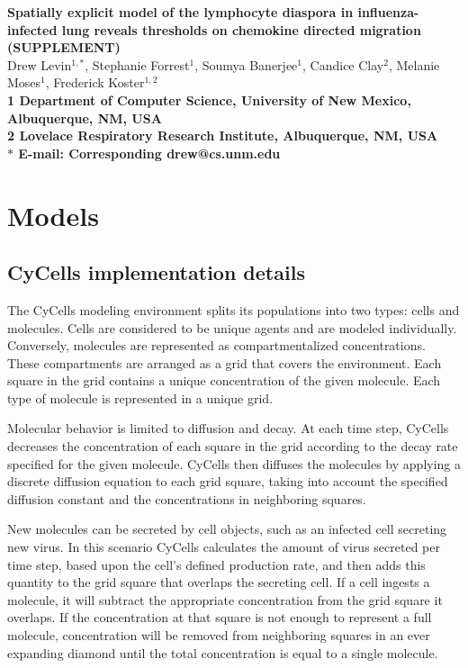 \documentclass[10pt]{article}
\date{}
\begin{document}
\begin{flushleft}
{\Large
\textbf{Spatially explicit model of the lymphocyte diaspora in influenza-infected lung reveals thresholds on chemokine directed migration (SUPPLEMENT)}
}
\\
Drew Levin$^{1,\ast}$, 
Stephanie Forrest$^{1}$, 
Soumya Banerjee$^{1}$,
Candice Clay$^{2}$, 
Melanie Moses$^{1}$, 
Frederick Koster$^{1,2}$
\\
\bf{1} Department of Computer Science, University of New Mexico, Albuquerque, NM, USA
\\
\bf{2} Lovelace Respiratory Research Institute, Albuquerque, NM, USA
\\
$\ast$ E-mail: Corresponding drew@cs.unm.edu
\end{flushleft}


\section{Models}

\subsection{CyCells implementation details}

The CyCells modeling environment splits its populations into two types: cells and molecules.  Cells are considered to be unique agents and are modeled individually.  Conversely, molecules are represented as compartmentalized concentrations.  These compartments are arranged as a grid that covers the environment.  Each square in the grid contains a unique concentration of the given molecule.  Each type of  molecule is represented in a unique grid.

Molecular behavior is limited to diffusion and decay.  At each time step, CyCells decreases the concentration of each square in the grid according to the decay rate specified for the given molecule.  CyCells then diffuses the molecules by applying a discrete diffusion equation to each grid square, taking into account the specified diffusion constant and the concentrations in neighboring squares.

New molecules can be secreted by cell objects, such as an infected cell secreting new virus.  In this scenario CyCells calculates the amount of virus secreted per time step, based upon the cell's defined production rate, and then adds this quantity to the grid square that overlaps the secreting cell.  If a cell ingests a molecule, it will subtract the appropriate concentration from the grid square it overlaps.  If the concentration at that square is not enough to represent a full molecule, concentration will be removed from neighboring squares in an ever expanding diamond until the total concentration is equal to a single molecule.
\end{document}
